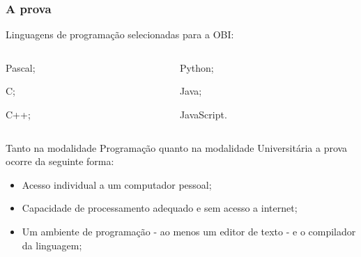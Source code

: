 \begin{frame}
 \frametitle{A prova}
 Linguagens de programação selecionadas para a OBI:
 \begin{itemize}
  \begin{columns}[T]
    \begin{column}[T]{4cm}
      \item Pascal;
      \item C;
      \item C++;
    \end{column}
    \begin{column}[T]{3cm}
      \item Python;
      \item Java;
      \item JavaScript.
    \end{column}
    
   \end{columns}
  \end{itemize}

 Tanto na modalidade Programação quanto na modalidade Universitária
 a prova ocorre da seguinte forma:
 \begin{itemize}
  \item Acesso individual a um computador pessoal;
  \item Capacidade de processamento adequado e sem acesso a internet;
  \item Um ambiente de programação - ao menos um editor de texto - e o compilador da linguagem;
 \end{itemize}

\end{frame}
